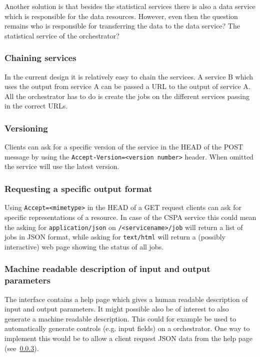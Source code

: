 \documentclass[a4paper]{article}
\begin{document}
Another solution is that besides the statistical services there is also a data
service which is responsible for the data resources. However, even then the
question remains who is responsible for transferring the data to the data
service? The statistical service of the orchestrator? 

\subsubsection{Chaining services}
In the current design it is relatively easy to chain the services. A service B
which uses the output from service A can be passed a URL to the output of
service A. All the orchestrator has to do is create the jobs on the different
services passing in the correct URLs. 

\subsubsection{Versioning}
Clients can ask for a specific version of the service in the HEAD of the POST
message by using the \texttt{Accept-Version=<version number>} header. When
omitted the service will use the latest version.


\subsubsection{Requesting a specific output format}
\label{sec:outputformat}
Using \texttt{Accept=<mimetype>} in the HEAD of a GET request clients can ask for
specific representations of a resource. In case of the CSPA service this could
mean the asking for \texttt{application/json} on \texttt{/<servicename>/job}
will return a list of jobs in JSON format, while asking for \texttt{text/html}
will return a (possibly interactive) web page showing the status of all jobs.


\subsubsection{Machine readable description of input and output parameters}
The interface contains a help page which gives a human readable description of
input and output parameters. It might possible also be of interest to also
generate a machine readable description. This could for example be used to
automatically generate controls (e.g. input fields) on a orchestrator. One way
to implement this would be to allow a client request JSON data from the help
page (see~\ref{sec:outputformat}). 
\end{document}
